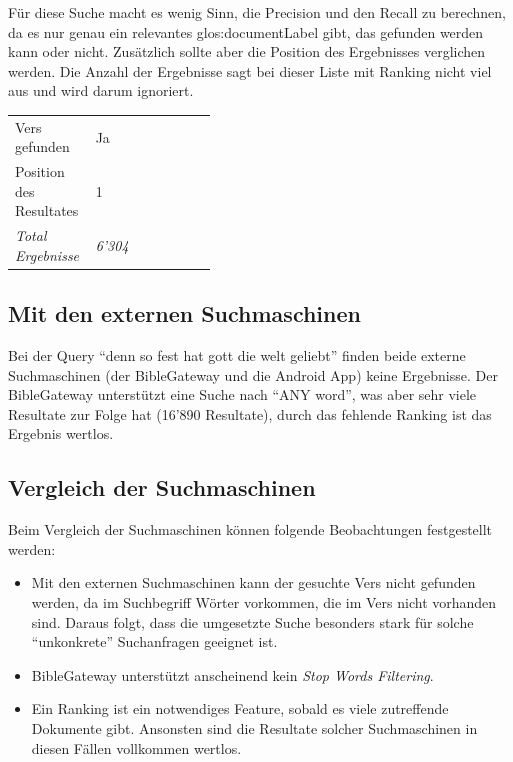 Für diese Suche macht es wenig Sinn, die Precision und den Recall zu berechnen, da es nur genau ein relevantes \gls{glos:documentLabel} gibt, das gefunden werden kann oder nicht.
Zusätzlich sollte aber die Position des Ergebnisses verglichen werden.
Die Anzahl der Ergebnisse sagt bei dieser Liste mit Ranking nicht viel aus und wird darum ignoriert.

\begin{table}[H]
	\centering
	\small\renewcommand{\arraystretch}{1.4}
	\begin{tabularx}{0.6\textwidth}{ L{0.4\linewidth} | X }%
		\hline
		Vers gefunden & Ja\\
		Position des Resultates & 1\\
		\textit{Total Ergebnisse} & \textit{6'304}\\
		\hline
	\end{tabularx}
\end{table}


\subsection{Mit den externen Suchmaschinen}
Bei der Query "`denn so fest hat gott die welt geliebt"' finden beide externe Suchmaschinen (der BibleGateway und die Android App) keine Ergebnisse.
Der BibleGateway unterstützt eine Suche nach "`ANY word"', was aber sehr viele Resultate zur Folge hat (16'890 Resultate), durch das fehlende Ranking ist das Ergebnis wertlos.

\subsection{Vergleich der Suchmaschinen}
Beim Vergleich der Suchmaschinen können folgende Beobachtungen festgestellt werden:
\begin{itemize}[noitemsep]
	\item Mit den externen Suchmaschinen kann der gesuchte Vers nicht gefunden werden, da im Suchbegriff Wörter vorkommen, die im Vers nicht vorhanden sind.
	Daraus folgt, dass die umgesetzte Suche besonders stark für solche "`unkonkrete"' Suchanfragen geeignet ist.
	
	\item BibleGateway unterstützt anscheinend kein \textit{Stop Words Filtering}.
	
	\item Ein Ranking ist ein notwendiges Feature, sobald es viele zutreffende Dokumente gibt.
	Ansonsten sind die Resultate solcher Suchmaschinen in diesen Fällen vollkommen wertlos.
\end{itemize}

